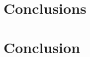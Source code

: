 \documentclass[a4paper,12pt,titlepage]{article} %
\numberwithin{equation}{section}  %
\begin{document}
	\section{Conclusions}
	\label{sec:conclution}
	
	
	
	
	
	
	\section{Conclusion}
	
	
\end{document}
